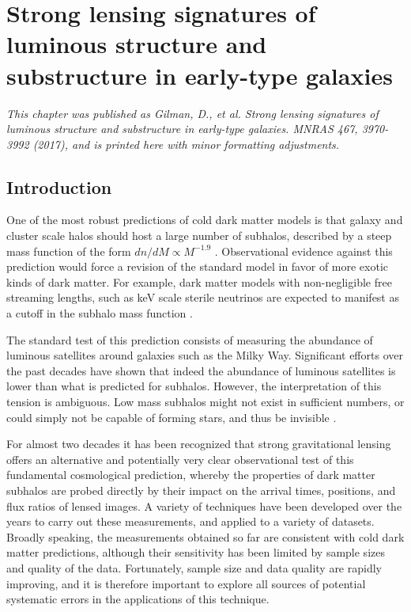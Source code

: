 \def\kex{{\kappa_{\rm e}}}
\def\RE{{R_{\rm E}}}
\def\Reff{{R_{\rm eff}}}
\def\gd{{\gamma_{\rm d}}}
\def\fd{{f_{\rm dm}}}
\def\ra{{r_{\rm a}}}

\chapter{Strong lensing signatures of luminous structure and substructure in early-type galaxies}
\textit{This chapter was published as Gilman, D., et al. Strong lensing signatures of luminous structure and substructure in early-type galaxies. MNRAS 467, 3970-3992 (2017), and is printed here with minor formatting adjustments.}

\section{Introduction}

One of the most robust predictions of cold dark matter models is that
galaxy and cluster scale halos should host a large number of subhalos,
described by a steep mass function of the form $dn/dM\propto M^{-1.9}$ \citep{Klypin++99,MaoSchnieder98}. Observational evidence against this prediction would force a revision of the standard model in favor of more exotic kinds of dark matter. For example, dark matter models with non-negligible free streaming lengths, such as keV scale sterile neutrinos are expected to manifest as a cutoff in the subhalo mass function \citep{Colombi++96,Vogelsberger++16,Bose++16,Lovell++16,Menci++16}.

The standard test of this prediction consists of measuring the abundance of luminous satellites around galaxies such as the Milky Way. Significant efforts over the past decades have shown that indeed the abundance of luminous satellites is lower than what is predicted for subhalos. However, the interpretation of this tension is ambiguous. Low mass subhalos might not exist in sufficient numbers, or could simply not be capable of forming stars, and thus be invisible \citep{Nierenberg++14,Nierenberg++16,Gao++11,Starkenburg++13,Wetzel++16,Sawala++16,DespVeg16}.

For almost two decades it has been recognized that strong gravitational lensing offers an alternative and potentially very clear observational test of this fundamental cosmological prediction, whereby the properties of dark matter subhalos are probed directly by their impact on the arrival times, positions, and flux ratios of lensed images. A variety of techniques have been developed over the years to carry out these measurements, and applied to a variety of datasets. Broadly speaking, the measurements obtained so far are consistent with cold dark matter predictions, although their sensitivity has been limited by sample sizes and quality of the data. Fortunately, sample size and data quality are rapidly improving, and it is therefore important to explore all sources of potential systematic errors in the applications of this technique.

